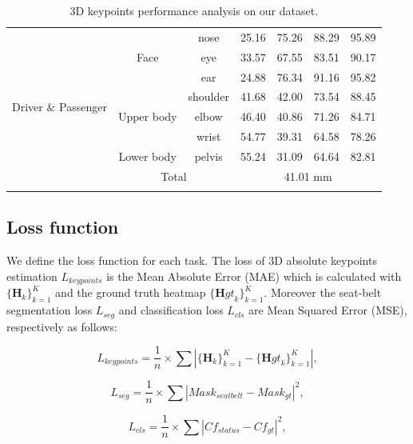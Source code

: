 \documentclass[letterpaper]{article} %
\begin{document}
\begin{table}[t]
\begin{tabular}{@{}c | c | c | c | c | c |c @{} }
\multirow{8}{*}{Driver $\&$ Passenger} &\multirow{3}{*}{Face} & nose  & 25.16 & 75.26  & 88.29       & 95.89 \\\cline{ 3-7}
& &eye      & 33.57 & 67.55 & 83.51 & 90.17 \\\cline{3-7}
& &ear      & 24.88 & 76.34 & 91.16 & 95.82 \\\cline{ 2-7}
&\multirow{3}{*}{Upper body}&shoulder & 41.68 & 42.00 & 73.54 & 88.45 \\\cline{ 3-7}
& & elbow      & 46.40 & 40.86 & 71.26 & 84.71 \\\cline{ 3-7}
& & wrist      & 54.77 & 39.31 & 64.58 & 78.26 \\\cline{ 2-7}
&Lower body& pelvis      & 55.24 & 31.09 & 64.64 & 82.81\\\cline{ 2-7}
& \multicolumn{2}{c|}{Total} & \multicolumn{4}{c}{41.01 mm}\\\Xhline{3\arrayrulewidth}

\Xhline{3\arrayrulewidth}
\end{tabular}%
\caption{3D keypoints performance analysis on our dataset.}
\label{tab:mpjpe}
\end{table}

\subsection{Loss function}
We define the loss function for each task. The loss of 3D absolute keypoints estimation ${L}_{keypoints}$ is the Mean Absolute Error (MAE) which is calculated with $\{{\mathbf H}_{k}\}_{k=1}^{K}$ and the ground truth heatmap $\{{\mathbf Hgt}_{k}\}_{k=1}^{K}$. Moreover the seat-belt segmentation loss ${L}_{seg}$ and classification loss ${L}_{cls}$ are Mean Squared Error (MSE), respectively as follows:

\begin{equation} \label{4}
{{L}_{keypoints} = \frac{1}{n}\times\sum\left|\{{\mathbf H}_{k}\}_{k=1}^{K} - \{{\mathbf Hgt}_{k}\}_{k=1}^{K}\right|},
\end{equation}

\begin{equation} \label{5}
{{L}_{seg} = \frac{1}{n}\times{\sum\left|{Mask}_{seatbelt} - {Mask}_{gt}\right|}^2},
\end{equation}

\begin{equation} \label{6}
{{L}_{cls} = \frac{1}{n}\times{\sum\left|{Cf}_{status} - {Cf}_{gt}\right|}^2},
\end{equation}
\end{document}
